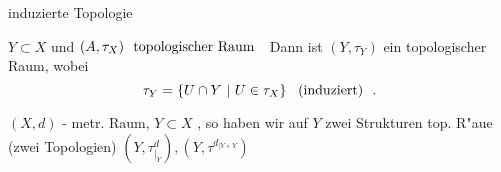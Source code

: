 \documentclass[class=article, crop=false]{standalone}
\begin{document}
\begin{zettel}{induzierte Topologie}
\begin{flashcard}
    $Y \subset X$ und $(A,\tau_X)  \tx{ topologischer Raum }$ 
    Dann ist $(Y,\tau_Y)$ ein topologischer Raum, wobei
    \[
        \tau_Y = \set{U \cap Y}{U \in  \tau _X} \tx{ (induziert) } 
    .\]
\end{flashcard}

\begin{remark}
    $(X,d)$ - metr. Raum, $Y \subset X$ , so haben wir auf $Y$ zwei Strukturen top. R"aue (zwei Topologien) $(Y,\tau^d_{|_Y}), (Y, \tau^{d_{|Y \times Y}})$ 
\end{remark}


\end{zettel}
\end{document}
